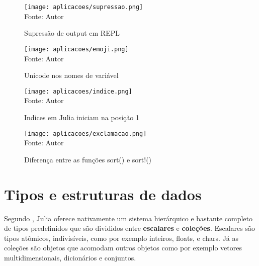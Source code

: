  
    \begin{figure}[H]%
    \begin{center}
        \label{supressao}
        \caption{Supressão de output em REPL} %
        \texttt{[image: aplicacoes/supressao.png]} \\
        {\tiny \sf Fonte: Autor}
    \end{center}
    \end{figure} 

    \begin{figure}[H]%
      \begin{center}
        \label{emoji}
        \caption{Unicode nos nomes de variável} 
        \texttt{[image: aplicacoes/emoji.png]} \\
        {\tiny \sf Fonte: Autor}
    \end{center}
    \end{figure} 

    \begin{figure}[H]%
    \begin{center}
        \label{indice}
        \caption{Indices em Julia iniciam na posição 1} 
        \texttt{[image: aplicacoes/indice.png]} \\
        {\tiny \sf Fonte: Autor}
    \end{center}
    \end{figure} 

    \begin{figure}[H]%
    \begin{center}
      \label{exclamacao}
      \caption{Diferença entre as funções sort() e sort!()} 
        \texttt{[image: aplicacoes/exclamacao.png]} \\
        {\tiny \sf Fonte: Autor}
    \end{center}
    \end{figure} 
\section{Tipos e estruturas de dados}
Segundo \cite{Lobianco2019}, Julia oferece nativamente um sistema hierárquico e bastante completo de tipos predefinidos que são divididos entre \textbf{escalares} e \textbf{coleções}.
Escalares são tipos atômicos, indivisíveis, como por exemplo inteiros, floats, e chars. Já as coleções são objetos que acomodam outros objetos como por exemplo vetores multidimensionais, dicionários e conjuntos.

